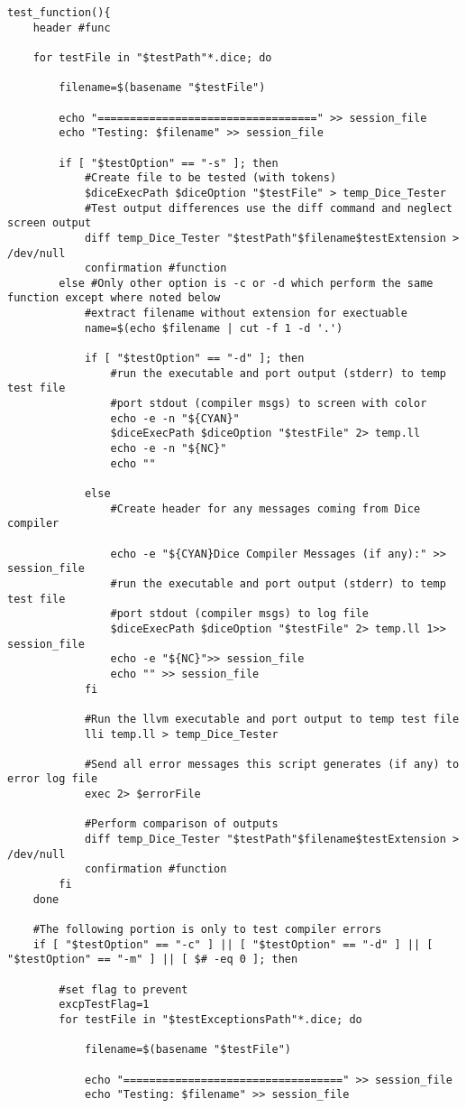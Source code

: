 \begin{verbatim}
test_function(){
	header #func

	for testFile in "$testPath"*.dice; do

		filename=$(basename "$testFile")

		echo "==================================" >> session_file
		echo "Testing: $filename" >> session_file

		if [ "$testOption" == "-s" ]; then
			#Create file to be tested (with tokens)
			$diceExecPath $diceOption "$testFile" > temp_Dice_Tester
			#Test output differences use the diff command and neglect screen output
			diff temp_Dice_Tester "$testPath"$filename$testExtension > /dev/null
			confirmation #function
		else #Only other option is -c or -d which perform the same function except where noted below
			#extract filename without extension for exectuable
			name=$(echo $filename | cut -f 1 -d '.')
			
			if [ "$testOption" == "-d" ]; then
				#run the executable and port output (stderr) to temp test file
				#port stdout (compiler msgs) to screen with color
				echo -e -n "${CYAN}"
				$diceExecPath $diceOption "$testFile" 2> temp.ll 
				echo -e -n "${NC}"
				echo ""

			else
				#Create header for any messages coming from Dice compiler
				
				echo -e "${CYAN}Dice Compiler Messages (if any):" >> session_file
				#run the executable and port output (stderr) to temp test file
				#port stdout (compiler msgs) to log file
				$diceExecPath $diceOption "$testFile" 2> temp.ll 1>> session_file
				echo -e "${NC}">> session_file
				echo "" >> session_file
			fi

			#Run the llvm executable and port output to temp test file
			lli temp.ll > temp_Dice_Tester

			#Send all error messages this script generates (if any) to error log file
			exec 2> $errorFile
			
			#Perform comparison of outputs
			diff temp_Dice_Tester "$testPath"$filename$testExtension > /dev/null
			confirmation #function
		fi
	done

	#The following portion is only to test compiler errors
	if [ "$testOption" == "-c" ] || [ "$testOption" == "-d" ] || [ "$testOption" == "-m" ] || [ $# -eq 0 ]; then

		#set flag to prevent 
		excpTestFlag=1
		for testFile in "$testExceptionsPath"*.dice; do

			filename=$(basename "$testFile")

			echo "==================================" >> session_file
			echo "Testing: $filename" >> session_file
		

\end{verbatim}
